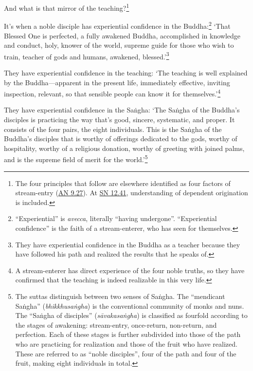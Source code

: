 \documentclass[12pt,openany]{book}%
\begin{document}
And what is that mirror of the teaching?\footnote{The four principles that follow are elsewhere identified as four factors of stream-entry (\href{https://suttacentral.net/an9.27/en/sujato}{AN 9.27}). At \href{https://suttacentral.net/sn12.41/en/sujato}{SN 12.41}, understanding of dependent origination is included. } 

It’s when a noble disciple has experiential confidence in the Buddha:\footnote{“Experiential” is \textit{avecca}, literally “having undergone”. “Experiential confidence” is the faith of a stream-enterer, who has seen for themselves. } ‘That Blessed One is perfected, a fully awakened Buddha, accomplished in knowledge and conduct, holy, knower of the world, supreme guide for those who wish to train, teacher of gods and humans, awakened, blessed.’\footnote{They have experiential confidence in the Buddha as a teacher because they have followed his path and realized the results that he speaks of. } 

They have experiential confidence in the teaching: ‘The teaching is well explained by the Buddha—apparent in the present life, immediately effective, inviting inspection, relevant, so that sensible people can know it for themselves.’\footnote{A stream-enterer has direct experience of the four noble truths, so they have confirmed that the teaching is indeed realizable in this very life. } 

They have experiential confidence in the \textsanskrit{Saṅgha}: ‘The \textsanskrit{Saṅgha} of the Buddha’s disciples is practicing the way that’s good, sincere, systematic, and proper. It consists of the four pairs, the eight individuals. This is the \textsanskrit{Saṅgha} of the Buddha’s disciples that is worthy of offerings dedicated to the gods, worthy of hospitality, worthy of a religious donation, worthy of greeting with joined palms, and is the supreme field of merit for the world.’\footnote{The suttas distinguish between two senses of \textsanskrit{Saṅgha}. The “mendicant \textsanskrit{Saṅgha}” (\textit{\textsanskrit{bhikkhusaṅgha}}) is the conventional community of monks and nuns. The “\textsanskrit{Saṅgha} of disciples” (\textit{\textsanskrit{sāvakasaṅgha}}) is classified as fourfold according to the stages of awakening: stream-entry, once-return, non-return, and perfection. Each of these stages is further subdivided into those of the path who are practicing for realization and those of the fruit who have realized. These are referred to as “noble disciples”, four of the path and four of the fruit, making eight individuals in total. } 
\end{document}
